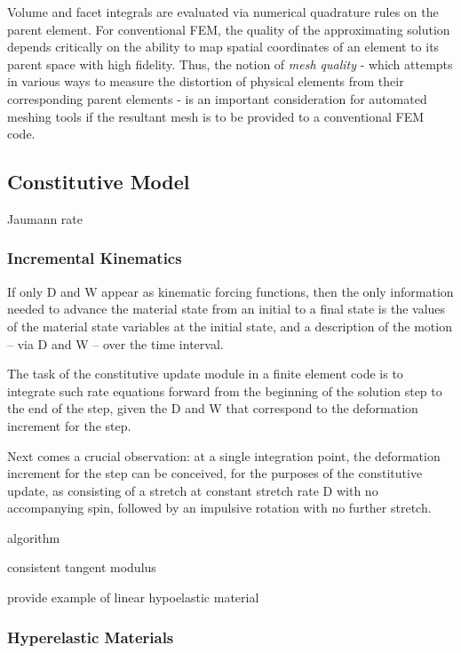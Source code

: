 Volume and facet integrals are evaluated via numerical quadrature rules on the parent element. For conventional FEM, the quality of the approximating solution depends critically on the ability to map spatial coordinates of an element to its parent space with high fidelity. Thus, the notion of \textit{mesh quality} - which attempts in various ways to measure the distortion of physical elements from their corresponding parent elements - is an important consideration for automated meshing tools if the resultant mesh is to be provided to a conventional FEM code.

\subsection{Constitutive Model}

Jaumann rate

\subsubsection{Incremental Kinematics}

If only D and W appear as kinematic forcing functions, then the only information needed to advance the material state from an initial to a final state is the values of the material state variables at the initial state, and a description of the motion – via D and W – over the time interval.

The task of the constitutive update module in a finite element code is to integrate such rate equations forward from the beginning of the solution step to the end of the step, given the D and W that correspond to the deformation increment for the step.

Next comes a crucial observation: at a single integration point, the deformation increment for the step can be conceived, for the purposes of the constitutive update, as consisting of a stretch at constant stretch rate D with no accompanying spin, followed by an impulsive rotation with no further stretch.

algorithm

consistent tangent modulus

provide example of linear hypoelastic material

\subsubsection{Hyperelastic Materials}

